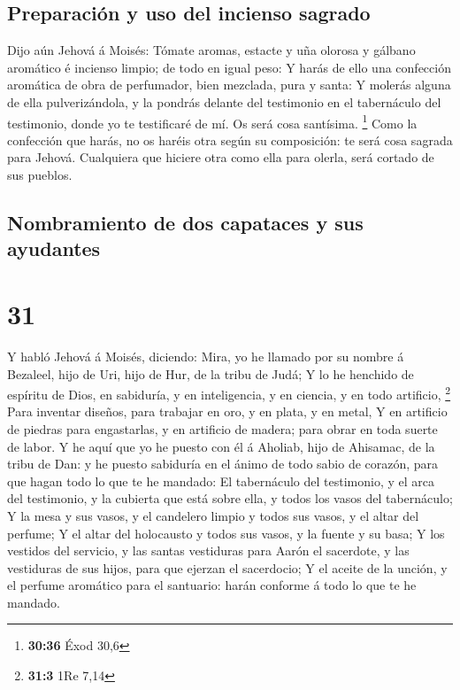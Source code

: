 \hypertarget{preparaciuxf3n-y-uso-del-incienso-sagrado}{%
\subsection{Preparación y uso del incienso
sagrado}\label{preparaciuxf3n-y-uso-del-incienso-sagrado}}

 Dijo aún Jehová á Moisés: Tómate aromas, estacte y uña
olorosa y gálbano aromático é incienso limpio; de todo en igual peso:
 Y harás de ello una confección aromática de obra de
perfumador, bien mezclada, pura y santa:  Y molerás alguna
de ella pulverizándola, y la pondrás delante del testimonio en el
tabernáculo del testimonio, donde yo te testificaré de mí. Os será cosa
santísima. \footnote{\textbf{30:36} Éxod 30,6}  Como la
confección que harás, no os haréis otra según su composición: te será
cosa sagrada para Jehová.  Cualquiera que hiciere otra como
ella para olerla, será cortado de sus pueblos.

\hypertarget{nombramiento-de-dos-capataces-y-sus-ayudantes}{%
\subsection{Nombramiento de dos capataces y sus
ayudantes}\label{nombramiento-de-dos-capataces-y-sus-ayudantes}}

\hypertarget{section-30}{%
\section{31}\label{section-30}}

 Y habló Jehová á Moisés, diciendo:  Mira, yo he
llamado por su nombre á Bezaleel, hijo de Uri, hijo de Hur, de la tribu
de Judá;  Y lo he henchido de espíritu de Dios, en
sabiduría, y en inteligencia, y en ciencia, y en todo artificio,
\footnote{\textbf{31:3} 1Re 7,14}  Para inventar diseños,
para trabajar en oro, y en plata, y en metal,  Y en
artificio de piedras para engastarlas, y en artificio de madera; para
obrar en toda suerte de labor.  Y he aquí que yo he puesto
con él á Aholiab, hijo de Ahisamac, de la tribu de Dan: y he puesto
sabiduría en el ánimo de todo sabio de corazón, para que hagan todo lo
que te he mandado:  El tabernáculo del testimonio, y el arca
del testimonio, y la cubierta que está sobre ella, y todos los vasos del
tabernáculo;  Y la mesa y sus vasos, y el candelero limpio y
todos sus vasos, y el altar del perfume;  Y el altar del
holocausto y todos sus vasos, y la fuente y su basa;  Y los
vestidos del servicio, y las santas vestiduras para Aarón el sacerdote,
y las vestiduras de sus hijos, para que ejerzan el sacerdocio;
 Y el aceite de la unción, y el perfume aromático para el
santuario: harán conforme á todo lo que te he mandado.

